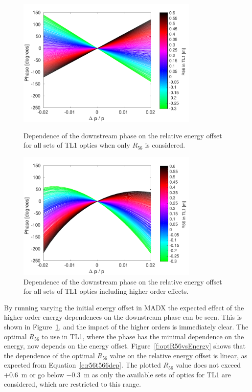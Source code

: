 \begin{figure}
  \centering
  \includegraphics[width=0.8\textwidth]{Figures/propagation/phaseVsEn_r56Only}
  \caption{Dependence of the downstream phase on the relative energy offset for all sets of TL1 optics when only \(R_{56}\) is considered.}
  \label{f:phaseVsEn_r56Only}  
  \centering
  \includegraphics[width=0.8\textwidth]{Figures/propagation/phaseVsEn_t566}
  \caption{Dependence of the downstream phase on the relative energy offset for all sets of TL1 optics including higher order effects.}
  \label{f:phaseVsEn_t566}
\end{figure}

By running varying the initial energy offset in MADX the expected effect of the higher order energy dependences on the downstream phase can be seen. This is shown in Figure~\ref{f:phaseVsEn_t566}, and the impact of the higher orders is immediately clear. The optimal \(R_{56}\) to use in TL1, where the phase has the minimal dependence on the energy, now depends on the energy offset. Figure~\ref{f:optR56vsEnergy} shows that the dependence of the optimal \(R_{56}\) value on the relative energy offset is linear, as expected from Equation~\ref{e:r56t566dep}. The plotted \(R_{56}\) value does not exceed \(+0.6\)~m or go below \(-0.3\)~m as only the available sets of optics for TL1 are considered, which are restricted to this range. %

